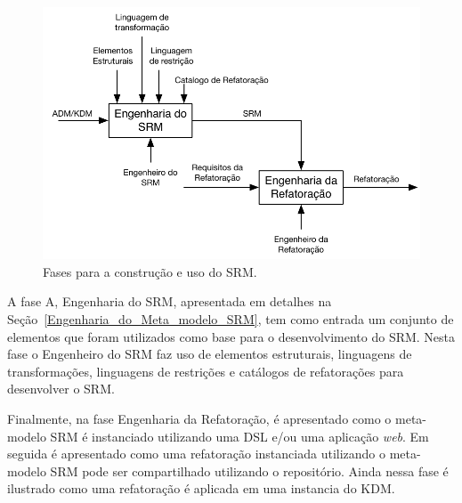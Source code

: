 \begin{figure}[h]
	\centering
	\caption{Fases para a construção e uso do SRM.}
	\label{fig:fases_para_a_construcao_e_uso_do_SRM}
	\includegraphics[scale=0.9]{images/fasesParaConstruirOSRM}
	\fautor
\end{figure}

A fase A, Engenharia do SRM, apresentada em detalhes na Seção~\ref{Engenharia_do_Meta_modelo_SRM}, tem como entrada um conjunto de elementos que foram utilizados como base para o desenvolvimento do SRM. Nesta fase o Engenheiro do SRM faz uso de elementos estruturais, linguagens de transformações, linguagens de restrições e catálogos de refatorações para desenvolver o SRM.



Finalmente, na fase Engenharia da Refatoração, é apresentado como o meta-modelo SRM é instanciado utilizando uma DSL e/ou uma aplicação \textit{web}. Em seguida é apresentado como uma refatoração instanciada utilizando o meta-modelo SRM pode ser compartilhado utilizando o repositório. Ainda nessa fase é ilustrado como uma refatoração é aplicada em uma instancia do KDM.

